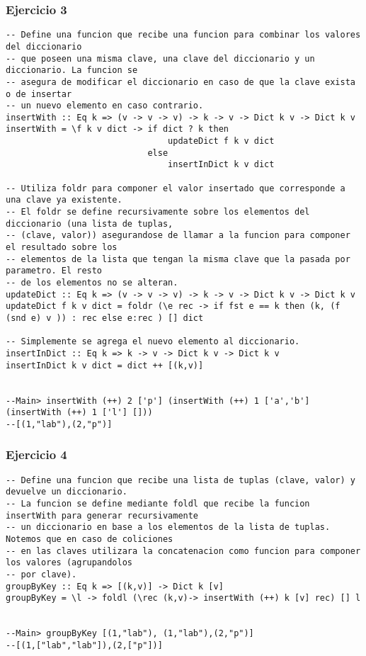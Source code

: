 \subsubsection*{Ejercicio 3}
\begin{lstlisting}
-- Define una funcion que recibe una funcion para combinar los valores del diccionario
-- que poseen una misma clave, una clave del diccionario y un diccionario. La funcion se 
-- asegura de modificar el diccionario en caso de que la clave exista o de insertar 
-- un nuevo elemento en caso contrario.
insertWith :: Eq k => (v -> v -> v) -> k -> v -> Dict k v -> Dict k v
insertWith = \f k v dict -> if dict ? k then 
								updateDict f k v dict 
							else 
								insertInDict k v dict
										
-- Utiliza foldr para componer el valor insertado que corresponde a una clave ya existente.
-- El foldr se define recursivamente sobre los elementos del diccionario (una lista de tuplas,
-- (clave, valor)) asegurandose de llamar a la funcion para componer el resultado sobre los
-- elementos de la lista que tengan la misma clave que la pasada por parametro. El resto
-- de los elementos no se alteran.
updateDict :: Eq k => (v -> v -> v) -> k -> v -> Dict k v -> Dict k v
updateDict f k v dict = foldr (\e rec -> if fst e == k then (k, (f (snd e) v )) : rec else e:rec ) [] dict 

-- Simplemente se agrega el nuevo elemento al diccionario.
insertInDict :: Eq k => k -> v -> Dict k v -> Dict k v
insertInDict k v dict = dict ++ [(k,v)] 


--Main> insertWith (++) 2 ['p'] (insertWith (++) 1 ['a','b'] (insertWith (++) 1 ['l'] []))
--[(1,"lab"),(2,"p")]
\end{lstlisting}
\vspace{1cm}

\subsubsection*{Ejercicio 4}
\begin{lstlisting}
-- Define una funcion que recibe una lista de tuplas (clave, valor) y devuelve un diccionario.
-- La funcion se define mediante foldl que recibe la funcion insertWith para generar recursivamente
-- un diccionario en base a los elementos de la lista de tuplas. Notemos que en caso de coliciones
-- en las claves utilizara la concatenacion como funcion para componer los valores (agrupandolos
-- por clave).
groupByKey :: Eq k => [(k,v)] -> Dict k [v]
groupByKey = \l -> foldl (\rec (k,v)-> insertWith (++) k [v] rec) [] l


--Main> groupByKey [(1,"lab"), (1,"lab"),(2,"p")]
--[(1,["lab","lab"]),(2,["p"])]
\end{lstlisting}
\vspace{1cm}


